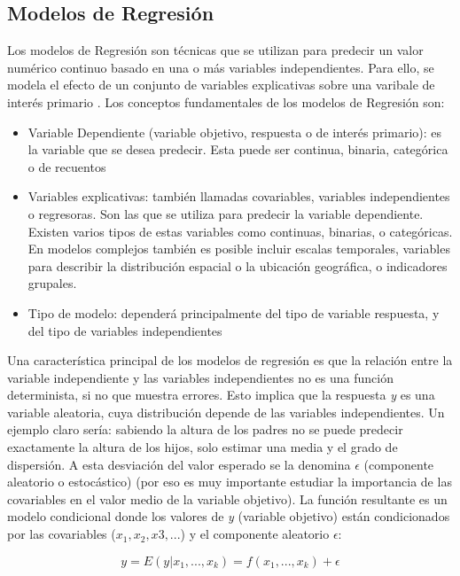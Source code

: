 \documentclass[12pt,a4paper,Spanish]{article}
\begin{document}
\subsection{Modelos de Regresión}
Los modelos de Regresión son técnicas que se utilizan para predecir un valor numérico continuo basado en una o más variables independientes. Para ello, se modela el efecto de un conjunto de variables explicativas sobre una varibale de interés primario \autocite{fahrmeir2013regression}.
\newline
Los conceptos fundamentales de los modelos de Regresión son:
\begin{itemize}
	\item Variable Dependiente (variable objetivo, respuesta o de interés primario): es la variable que se desea predecir. Esta puede ser continua, binaria, categórica o de recuentos
	\item Variables explicativas: también llamadas covariables, variables independientes o regresoras. Son las que se utiliza para predecir la variable dependiente. Existen varios tipos de estas variables como continuas, binarias,	o categóricas. En modelos complejos también es posible incluir escalas temporales, variables para describir la distribución espacial o la ubicación geográfica, o indicadores grupales.
	\item Tipo de modelo: dependerá principalmente del tipo de variable respuesta, y del tipo de variables independientes
\end{itemize}
Una característica principal de los modelos de regresión es que la relación entre la variable independiente y las variables independientes no es una función determinista, si no que muestra errores. Esto implica que la respuesta \textit{y} es una variable aleatoria, cuya distribución depende de las variables independientes. Un ejemplo claro sería: sabiendo la altura de los padres no se puede predecir exactamente la altura de los hijos, solo estimar una media y el grado de dispersión. A esta desviación del valor esperado se la denomina $\epsilon$ (componente aleatorio o estocástico) (por eso es muy importante estudiar la importancia de las covariables en el valor medio de la variable objetivo). La función resultante es un modelo condicional donde los valores de \textit{y} (variable objetivo) están condicionados por las covariables ($x_1, x_2, x3, ...$) y el componente aleatorio $\epsilon$:

\begin{equation}
	y = E(y|x_1, ..., x_k) = f(x_1, ..., x_k) + \epsilon 
\end{equation}
\end{document}
